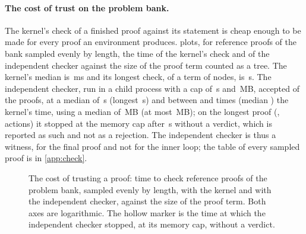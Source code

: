 \paragraph{The cost of trust on the problem bank.}
The kernel's check of a finished proof against its statement is cheap enough to be made for every proof an environment produces.
 plots, for \chkSampled{} reference proofs of the bank sampled evenly by length, the time of the kernel's check and of the independent checker against the size of the proof term counted as a tree.
The kernel's median is \chkKernelMedianMs\,ms and its longest check, of a term of \chkCapNodes{} nodes, is \chkCapKernelS\,s.
The independent checker, run in a child process with a cap of \chkCapS\,s and \chkCapMB\,MB, accepted \chkAccepted{} of the \chkSampled{} proofs, at a median of \chkIndMedianS\,s (longest \chkIndMaxS\,s) and between \chkRatioMin{} and \chkRatioMax{} times (median \chkRatioMedian) the kernel's time, using a median of \chkIndMemMedianMB\,MB (at most \chkIndMemMaxMB\,MB); on the longest proof (\code{\chkCapName}, \chkCapActions{} actions) it stopped at the memory cap after \chkCapAfterS\,s without a verdict, which is reported as such and not as a rejection.
The independent checker is thus a witness, for the final proof and not for the inner loop; the table of every sampled proof is in \cref{app:check}.

\begin{figure}[t]
\centering
{}
\caption{The cost of trusting a proof: time to check \chkSampled{} reference proofs of the problem bank, sampled evenly by length, with the kernel and with the independent checker, against the size of the proof term.
  Both axes are logarithmic.
  The hollow marker is the time at which the independent checker stopped, at its memory cap, without a verdict.}
\label{fig:trust}
\end{figure}

